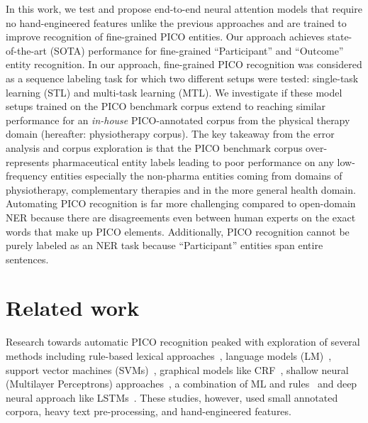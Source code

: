 \documentclass[runningheads]{llncs}
\begin{document}
In this work, we test and propose end-to-end neural attention models that require no hand-engineered features unlike the previous approaches and are trained to improve recognition of fine-grained PICO entities.
Our approach achieves state-of-the-art (SOTA) performance for fine-grained ``Participant'' and ``Outcome'' entity recognition.
In our approach, fine-grained PICO recognition was considered as a sequence labeling task for which two different setups were tested: single-task learning (STL) and multi-task learning (MTL).
We investigate if these model setups trained on the PICO benchmark corpus extend to reaching similar performance for an \textit{in-house} PICO-annotated corpus from the physical therapy domain (hereafter: physiotherapy corpus).
The key takeaway from the error analysis and corpus exploration is that the PICO benchmark corpus over-represents pharmaceutical entity labels leading to poor performance on any low-frequency entities especially the non-pharma entities coming from domains of physiotherapy, complementary therapies and in the more general health domain.
Automating PICO recognition is far more challenging compared to open-domain NER because there are disagreements even between human experts on the exact words that make up PICO elements.
Additionally, PICO recognition cannot be purely labeled as an NER task because ``Participant'' entities span entire sentences.
%
\section{Related work}
\label{sec:relatedwork}
%
Research towards automatic PICO recognition peaked with exploration of several methods including rule-based lexical approaches~\cite{dawes2007identification}, language models (LM)~\cite{boudin2010clinical}, support vector machines (SVMs)~\cite{boudin2010improving}, graphical models like CRF~\cite{chabou2018combination}, shallow neural (Multilayer Perceptrons) approaches~\cite{pmid20470429}, a combination of ML and rules~\cite{chabou2018combination} and deep neural approach like LSTMs~\cite{jin2018pico}. 
These studies, however, used small annotated corpora, heavy text pre-processing, and hand-engineered features.
\end{document}
